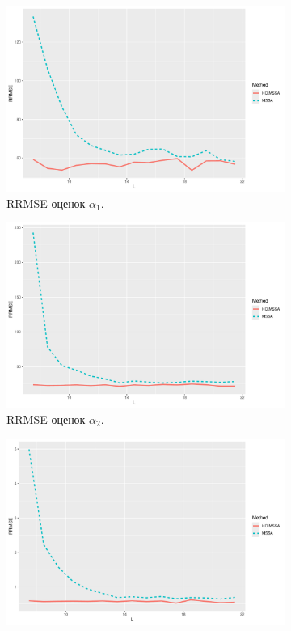 \documentclass[specialist,
  substylefile=spbu_report.rtx,
subf,href,colorlinks=true, 12pt]{disser}
\theoremstyle{plain}
\theoremstyle{definition}
\theoremstyle{remark}
\begin{document}
\begin{figure}[!ht]
  \centering
  \begin{subfigure}{0.49\linewidth}
    \includegraphics[width=\linewidth, height=0.167\textheight]{rate1_L.pdf}
    \caption{RRMSE оценок $\alpha_1$.}
    \label{fig:rate1_L}
  \end{subfigure}
  \begin{subfigure}{0.49\linewidth}
    \includegraphics[width=\linewidth, height=0.167\textheight]{rate2_L.pdf}
    \caption{RRMSE оценок $\alpha_2$.}
    \label{fig:rate2_L}
  \end{subfigure}
  \begin{subfigure}{0.49\linewidth}
    \includegraphics[width=\linewidth, height=0.167\textheight]{freq1_L.pdf}

\end{subfigure}
\end{figure}
\end{document}

